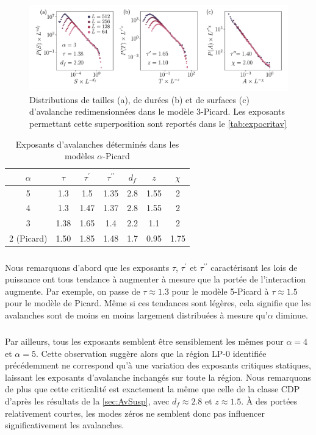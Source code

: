 \begin{figure}[h]
	\centering
	\includegraphics[width=\textwidth]{Chapitre4/Figures/Avalanches/Rescale_Av_alpha3.pdf}
	\caption{Distributions de tailles (a), de durées (b) et de surfaces (c) d'avalanche redimensionnées dans le modèle 3-Picard. Les exposants permettant cette superposition sont reportés dans le \autoref{tab:expocritav}}
	\label{fig:Av_rescale_alpha3}
\end{figure}

\begin{table}[h]
\centering
\begin{tabular}{ccccccc}
\hline \hline $\alpha$ & $\tau$ & \multicolumn{1}{c}{$\tau^\prime$} & $\tau^{\prime\prime}$ & $d_f$ & $z$ & $\chi$ \\
\hline 5 & 1.3 & 1.5 & 1.35 & 2.8 & 1.55 & 2 \\
4 & 1.3 & 1.47 & 1.37 & 2.8 & 1.55 & 2 \\
3 & 1.38 & 1.65 & 1.4 & 2.2 & 1.1 & 2 \\
2 (Picard) & 1.50 & 1.85 & 1.48 & 1.7 & 0.95 & 1.75 \\
\hline \hline
\end{tabular}
\caption{Exposants d'avalanches déterminés dans les modèles $\alpha$-Picard}
\label{tab:expocritav}
\end{table}

\subparagraph{}Nous remarquons d'abord que les exposants $\tau$, $\tau^\prime$ et $\tau^{\prime\prime}$ caractérisant les lois de puissance ont tous tendance à augmenter à mesure que la portée de l'interaction augmente. Par exemple, on passe de $\tau\approx 1.3$ pour le modèle 5-Picard à $\tau \approx 1.5$ pour le modèle de Picard. Même si ces tendances sont légères, cela signifie que les avalanches sont de moins en moins largement distribuées à mesure qu'$\alpha$ diminue.

\subparagraph{}Par ailleurs, tous les exposants semblent être sensiblement les mêmes pour $\alpha=4$ et $\alpha=5$. Cette observation suggère alors que la région LP-0 identifiée précédemment ne correspond qu'à une variation des exposants critiques statiques, laissant les exposants d'avalanche inchangés sur toute la région. Nous remarquons de plus que cette criticalité est exactement la même que celle de la classe CDP d'après les résultats de la \autoref{sec:AvSusp}, avec $d_f\approx 2.8$ et $z\approx 1.5$. \`A des portées relativement courtes, les modes zéros ne semblent donc pas influencer significativement les avalanches.

